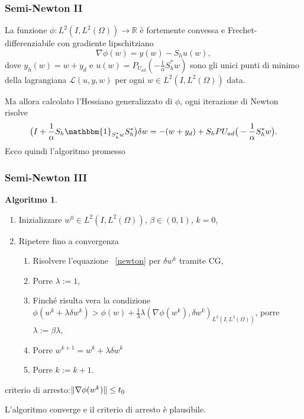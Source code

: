 \documentclass{beamer}
\theoremstyle{definition}
\theoremstyle{remark}
\theoremstyle{plain}
\theoremstyle{definition}
\newtheorem{algoritmo}{Algoritmo}
\DeclarePairedDelimiter{\norma}{\lVert}{\rVert}
\newcommand{\numberset}{\mathbb}
\newcommand{\R}{\numberset{R}}
\begin{document}
\begin{frame}
\frametitle{Semi-Newton II}
\begin{lemma}
La funzione $ \phi:L^2(I,L^2(\Omega))\to\R $  è fortemente convessa e Frechet-differenziabile con gradiente lipschitziano
\begin{equation}
\nabla\phi(w)=y(w)-S_hu(w),
\end{equation}
dove $ y_h(w)=w+y_d $ e $ u(w)=P_{U_{ad}}(-\frac{1}{\alpha}S^*_hw) $ sono gli unici punti di minimo della lagrangiana $ \mathcal{L}(u,y,w) $ per ogni $ w\in L^2(I,L^2(\Omega)) $ data.
\end{lemma}
Ma allora calcolato l'Hessiano generalizzato di $ \phi $, ogni iterazione di Newton risolve
\begin{equation}
\label{newton}
\big( I + \frac{1}{\alpha}S_h\mathbbm{1}_{S^*_hw}S^*_h\big)\delta w=-(w+y_d)+S_hP{U_{ad}}\big( -\frac{1}{\alpha}S^*_hw\big).
\end{equation}
Ecco quindi l'algoritmo promesso
\end{frame}

\begin{frame}
\frametitle{Semi-Newton III}
\begin{algoritmo}
\begin{enumerate}
\item Inizializzare $ w^0\in L^2(I,L^2(\Omega)) $, $\beta\in(0,1) $, $ k=0 $, 
\item Ripetere fino a convergenza
          \begin{enumerate}
          \item Risolvere l'equazione ~\eqref{newton} per $ \delta w^k $ tramite CG,
          \item Porre $ \lambda:=1 $,
          \item Finché risulta vera la condizione $ \phi(w^k+\lambda\delta w^k) > \phi(w) + \frac{1}{3}\lambda(\nabla\phi(w^k),\delta w^k)_{L^2(I,L^2(\Omega))} $, porre $ \lambda:=\beta\lambda $,
          \item Porre $ w^{k+1}=w^k + \lambda\delta w^k $
         \item Porre $ k:=k+1 $.
          \end{enumerate}
\end{enumerate}
criterio di arresto:$ \norma{\nabla\phi(w^k)}\le t_0 $
\end{algoritmo}
L'algoritmo converge e il criterio di arresto è plausibile.
\end{frame}
\end{document}
